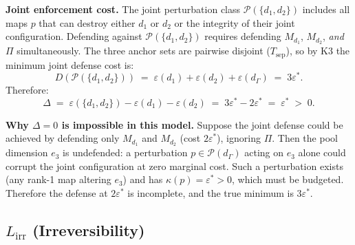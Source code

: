\documentclass[11pt]{article}
\theoremstyle{remark}
\begin{document}
\smallskip\noindent\textbf{Joint enforcement cost.}  The joint perturbation class $\mathcal{P}(\{d_1, d_2\})$ includes all maps $p$ that can destroy either $d_1$ or $d_2$ or the integrity of their joint configuration.  Defending against $\mathcal{P}(\{d_1, d_2\})$ requires defending $M_{d_1}$, $M_{d_2}$, \emph{and} $\Pi$ simultaneously.  The three anchor sets are pairwise disjoint ($T_{\mathrm{sep}}$), so by K3 the minimum joint defense cost is:
\[
D(\mathcal{P}(\{d_1,d_2\})) \;=\; \varepsilon(d_1) + \varepsilon(d_2) + \varepsilon(d_\Gamma) \;=\; 3\varepsilon^*.
\]
Therefore:
\[
\Delta \;=\; \varepsilon(\{d_1,d_2\}) - \varepsilon(d_1) - \varepsilon(d_2) \;=\; 3\varepsilon^* - 2\varepsilon^* \;=\; \varepsilon^* \;>\; 0.
\]

\smallskip\noindent\textbf{Why $\Delta = 0$ is impossible in this model.}  Suppose the joint defense could be achieved by defending only $M_{d_1}$ and $M_{d_2}$ (cost $2\varepsilon^*$), ignoring $\Pi$.  Then the pool dimension $e_3$ is undefended: a perturbation $p \in \mathcal{P}(d_\Gamma)$ acting on $e_3$ alone could corrupt the joint configuration at zero marginal cost.  Such a perturbation exists (any rank-1 map altering $e_3$) and has $\kappa(p) = \varepsilon^* > 0$, which must be budgeted.  Therefore the defense at $2\varepsilon^*$ is incomplete, and the true minimum is $3\varepsilon^*$.



\subsection{$L_{\mathrm{irr}}$ (Irreversibility)}
\end{document}
